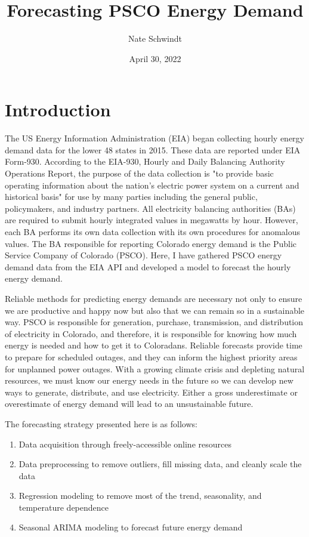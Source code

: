 \documentclass[12pt]{article}
\title{Forecasting PSCO Energy Demand}
\author{Nate Schwindt}
\date{April 30, 2022}
\begin{document}
\maketitle

\section*{Introduction} 

The US Energy Information Administration (EIA) began collecting hourly energy demand data for the lower 48 states in 2015. These data are reported under EIA Form-930. According to the EIA-930, Hourly and Daily Balancing Authority Operations Report, the purpose of the data collection is "to provide basic operating information about the nation's electric power system on a current and historical basis" for use by many parties including the general public, policymakers, and industry partners. All electricity balancing authorities (BAs) are required to submit hourly integrated values in megawatts by hour. However, each BA performs its own data collection with its own procedures for anomalous values. The BA responsible for reporting Colorado energy demand is the Public Service Company of Colorado (PSCO). Here, I have gathered PSCO energy demand data from the EIA API and developed a model to forecast the hourly energy demand.

Reliable methods for predicting energy demands are necessary not only to ensure we are productive and happy now but also that we can remain so in a sustainable way. PSCO is responsible for generation, purchase, transmission, and distribution of electricity in Colorado, and therefore, it is responsible for knowing how much energy is needed and how to get it to Coloradans. Reliable forecasts provide time to prepare for scheduled outages, and they can inform the highest priority areas for unplanned power outages. With a growing climate crisis and depleting natural resources, we must know our energy needs in the future so we can develop new ways to generate, distribute, and use electricity. Either a gross underestimate or overestimate of energy demand will lead to an unsustainable future.

The forecasting strategy presented here is as follows:
\begin{enumerate}
    \item Data acquisition through freely-accessible online resources
    \item Data preprocessing to remove outliers, fill missing data, and cleanly scale the data
    \item Regression modeling to remove most of the trend, seasonality, and temperature dependence
    \item Seasonal ARIMA modeling to forecast future energy demand
\end{enumerate}
\end{document}
